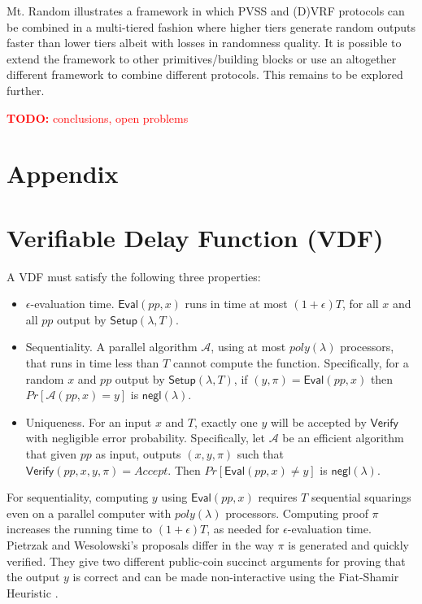 \documentclass[letterpaper,twocolumn,10pt]{article}
\theoremstyle{definition}
\theoremstyle{remark}
\newcommand{\todo}[1]{\textcolor{red}{\textbf{TODO:} #1}}
\begin{document}
Mt. Random illustrates a framework in which PVSS and (D)VRF protocols can be combined in a multi-tiered fashion where higher tiers generate random outputs faster than lower tiers albeit with losses in randomness quality. It is possible to extend the framework to other primitives/building blocks or use an altogether different framework to combine different protocols. This remains to be explored further.

\todo{conclusions, open problems}

\printbibliography
\appendix
\section*{Appendix}
\renewcommand{\thesection}{\arabic{section}}
\section{Verifiable Delay Function (VDF)}
\label{appendix:vdf}

A VDF must satisfy the following three properties:
\begin{itemize}
\item $\epsilon$-evaluation time. $\mathsf{Eval}(pp, x)$ runs in time at most $(1 + \epsilon) T$, for all $x$ and all $pp$ output by $\mathsf{Setup}(\lambda, T)$.
\item Sequentiality. A parallel algorithm $\mathcal{A}$, using at most $poly(\lambda)$ processors, that runs in time less than $T$ cannot compute the function. Specifically, for a random $x$ and $pp$ output by $\mathsf{Setup}(\lambda, T)$, if $(y, \pi) = \mathsf{Eval}(pp, x)$ then $Pr[\mathcal{A}(pp, x) = y]$ is $\mathsf{negl(\lambda)}$.
\item Uniqueness. For an input $x$ and $T$, exactly one $y$ will be accepted by $\mathsf{Verify}$ with negligible error probability. Specifically, let $\mathcal{A}$ be an efficient algorithm that given $pp$ as input, outputs $(x, y, \pi)$ such that $\mathsf{Verify}(pp, x, y, \pi) = Accept$. Then $Pr[\mathsf{Eval}(pp, x) \neq y]$ is $\mathsf{negl(\lambda)}$.
\end{itemize}
For sequentiality, computing $y$ using $\mathsf{Eval}(pp,x)$ requires $T$ sequential squarings even on a parallel computer with $poly(\lambda)$ processors. Computing proof $\pi$ increases the running time to $(1+\epsilon)T$, as needed for $\epsilon$-evaluation time. Pietrzak \cite{pietrzak2018simple} and Wesolowski's \cite{wesolowski2019efficient} proposals differ in the way $\pi$ is generated and quickly verified. They give two different public-coin succinct arguments for proving that the output $y$ is correct and can be made non-interactive using the Fiat-Shamir Heuristic \cite{amos1986prove}. 
\end{document}
